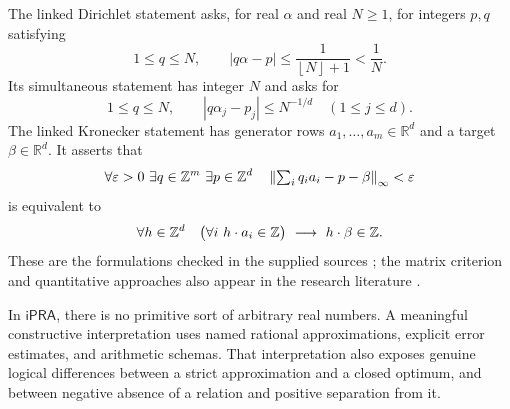 \documentclass[11pt]{article}
\theoremstyle{definition}\newtheorem{definition}[theorem]{Definition}
\theoremstyle{remark}\newtheorem{remark}[theorem]{Remark}
\newcommand{\ipra}{\mathsf{iPRA}}\newcommand{\HA}{\mathsf{HA}}
\newcommand{\norminf}[1]{\left\|#1\right\|_{\infty}}
\newcommand{\floor}[1]{\left\lfloor#1\right\rfloor}
\begin{document}
The linked Dirichlet statement asks, for real $\alpha$ and real $N\ge1$, for integers $p,q$ satisfying
\begin{equation}\label{eq:classical-dir}
 1\le q\le N,\qquad |q\alpha-p|\le\frac1{\floor N+1}<\frac1N.
\end{equation}
Its simultaneous statement has integer $N$ and asks for
\begin{equation}\label{eq:sim-classical}
 1\le q\le N,\qquad
 |q\alpha_j-p_j|\le N^{-1/d}\quad(1\le j\le d).
\end{equation}
The linked Kronecker statement has generator rows $a_1,\ldots,a_m\in\mathbb R^d$ and a target $\beta\in\mathbb R^d$. It asserts that
\begin{equation}\label{eq:approx-classical}
 \forall\varepsilon>0\ \exists q\in\Z^m\ \exists p\in\Z^d\quad
 \norminf{\textstyle\sum_iq_i a_i-p-\beta}<\varepsilon
\end{equation}
is equivalent to
\begin{equation}\label{eq:exact-compat}
 \forall h\in\Z^d\quad
 \bigl(\forall i\ h\cdot a_i\in\Z\bigr)\ \longrightarrow\ h\cdot\beta\in\Z.
\end{equation}
These are the formulations checked in the supplied sources \cite{dirichlet-wiki,kronecker-wiki}; the matrix criterion and quantitative approaches also appear in the research literature \cite{gonek-montgomery}.

In $\ipra$, there is no primitive sort of arbitrary real numbers. A meaningful constructive interpretation uses named rational approximations, explicit error estimates, and arithmetic schemas. That interpretation also exposes genuine logical differences between a strict approximation and a closed optimum, and between negative absence of a relation and positive separation from it.
\end{document}
